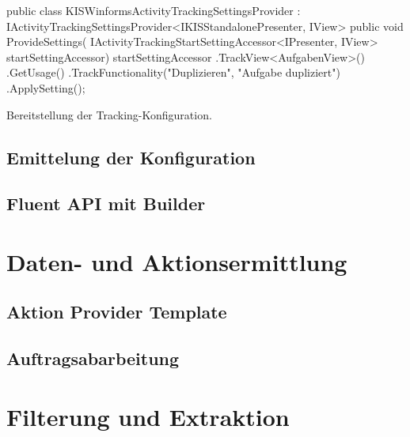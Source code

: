 \begin{program}[H]
\begin{CsCode}
public class KISWinformsActivityTrackingSettingsProvider 
    : IActivityTrackingSettingsProvider<IKISStandalonePresenter, IView>
{
    public void ProvideSettings(
        IActivityTrackingStartSettingAccessor<IPresenter, IView> startSettingAccessor)
    {
        startSettingAccessor
            .TrackView<AufgabenView>()
            .GetUsage()
            .TrackFunctionality("Duplizieren", "Aufgabe dupliziert")
            .ApplySetting();
    }
}
\end{CsCode}
\caption{Bereitstellung der Tracking-Konfiguration.}
\label{prog:settings_provider}
\end{program}

\subsection{Emittelung der Konfiguration}



\subsection{Fluent API mit Builder}
\label{subsec:builder_implementation}

\section{Daten- und Aktionsermittlung}
\label{sec:data_collection_impl}

\subsection{Aktion Provider Template}

\subsection{Auftragsabarbeitung}

\section{Filterung und Extraktion}
\label{sec:data_extraction_impl}


